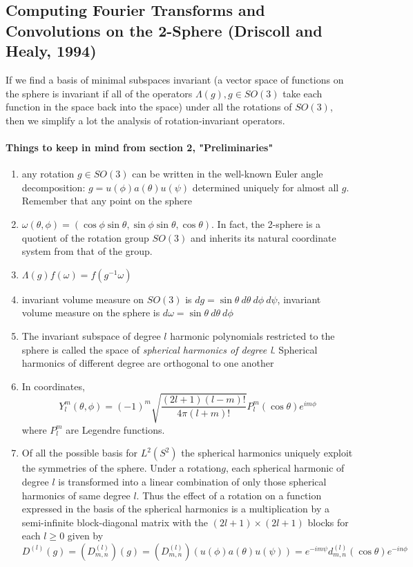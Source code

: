\subsection{Computing Fourier Transforms and Convolutions on the 2-Sphere (Driscoll and Healy, 1994)}
If we find a basis of minimal subspaces invariant (a vector space of functions on the sphere is invariant if all of the operators $\Lambda(g), g\in SO(3)$ take each function in the space back into the space) under all the rotations of $SO(3)$, then we simplify a lot the analysis of rotation-invariant operators.
\paragraph{Things to keep in mind from section 2, "Preliminaries"}
\begin{enumerate}
	\item any rotation $g\in SO(3)$ can be written in the well-known Euler angle decomposition: $g = u(\phi)a(\theta)u(\psi)$ determined uniquely for almost all $g$. Remember that any point on the sphere
	\item $\omega(\theta, \phi) = \left(\cos\phi\sin\theta, \sin\phi\sin\theta, \cos\theta\right)$. In fact, the 2-sphere is a quotient of the rotation group $SO(3)$ and inherits its natural coordinate system from that of the group.
	\item $\Lambda(g)f(\omega) = f(g^{-1}\omega)$
	\item invariant volume measure on $SO(3)$ is $dg=\sin\theta\ d\theta\ d\phi\ d\psi$, invariant volume measure on the sphere is $d\omega = \sin\theta\ d\theta\ d\phi$
	\item The invariant subspace of degree $l$ harmonic polynomials restricted to the sphere is called the space of \textit{spherical harmonics of degree l}. Spherical harmonics of different degree are orthogonal to one another
	\item In coordinates, 
	$$Y_l^m(\theta, \phi) =(-1)^m\sqrt{\frac{(2l+1)(l-m)!}{4\pi(l+m)!}}P_l^m(\cos\theta)e^{im\phi}$$
	where $P_l^m$ are Legendre functions.
	\item Of all the possible basis for $L^2(S^2)$ the spherical harmonics uniquely exploit the symmetries of the sphere. Under a rotation$g$, each spherical harmonic of degree $l$ is transformed into a linear combination of only those spherical harmonics of same degree $l$.
	Thus the effect of a rotation on a function expressed in the basis of the spherical harmonics is a multiplication by a semi-infinite block-diagonal matrix with the $(2l+1)\times(2l+1)$ blocks for each $l \geq 0$ given by $$D^{(l)}(g) = \left(D^{(l)}_{m,n}\right) (g) =  \left(D^{(l)}_{m,n}\right)(u(\phi)a(\theta)u(\psi)) = e^{-im\psi}d^{(l)}_{m,n}(\cos \theta) e^{-in\phi}$$

\end{enumerate}
